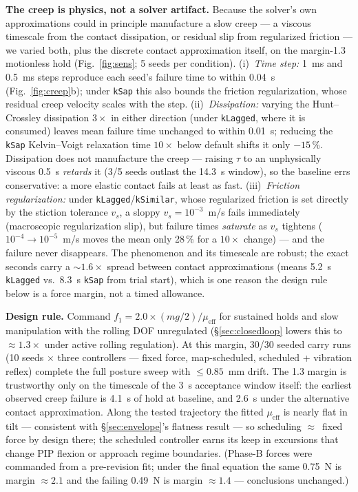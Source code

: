 \documentclass[journal]{IEEEtran}
\newcommand{\mueff}{\mu_{\mathrm{eff}}}
\begin{document}
\textbf{The creep is physics, not a solver artifact.} Because the solver's
own approximations could in principle manufacture a slow creep --- a
viscous timescale from the contact dissipation, or residual slip from
regularized friction --- we varied both, plus the discrete contact
approximation itself, on the margin-1.3 motionless hold
(Fig.~\ref{fig:sens}; 5 seeds per condition). (i)~\emph{Time step:}
1~ms and 0.5~ms steps reproduce each seed's failure time to within 0.04~s
(Fig.~\ref{fig:creep}b); under \texttt{kSap} this also bounds the friction
regularization, whose residual creep velocity scales with the step.
(ii)~\emph{Dissipation:} varying the Hunt--Crossley dissipation
$3\times$ in either direction (under \texttt{kLagged}, where it is
consumed) leaves mean failure time unchanged to within 0.01~s; reducing
the \texttt{kSap} Kelvin--Voigt relaxation time $10\times$ below default
shifts it only $-15\,\%$. Dissipation does not manufacture the creep ---
raising $\tau$ to an unphysically viscous 0.5~s \emph{retards} it (3/5
seeds outlast the 14.3~s window), so the baseline errs conservative: a
more elastic contact fails at least as fast. (iii)~\emph{Friction
regularization:} under \texttt{kLagged}/\texttt{kSimilar}, whose
regularized friction is set directly by the stiction tolerance $v_s$, a
sloppy $v_s = 10^{-3}$~m/s fails immediately (macroscopic regularization
slip), but failure times \emph{saturate} as $v_s$ tightens ($10^{-4} \to
10^{-5}$~m/s moves the mean only 28\,\% for a $10\times$ change) --- and
the failure never disappears. The phenomenon and its timescale are
robust; the exact seconds carry a ${\sim}1.6\times$ spread between
contact approximations (means 5.2~s \texttt{kLagged} vs.\ 8.3~s
\texttt{kSap} from trial start), which is one reason the design rule
below is a force margin, not a timed allowance.

\textbf{Design rule.} Command
$f_1 = 2.0 \times (mg/2)/\mueff$
for sustained holds and slow manipulation with the rolling DOF
unregulated (\S\ref{sec:closedloop} lowers this to
${\approx}1.3\times$ under active rolling regulation). At this margin, 30/30 seeded
carry runs (10 seeds $\times$ three controllers --- fixed force,
map-scheduled, scheduled + vibration reflex) complete the full posture
sweep with ${\le}0.85$~mm drift. The 1.3 margin is trustworthy only on
the timescale of the 3~s acceptance window itself: the earliest observed
creep failure is 4.1~s of hold at baseline, and 2.6~s under the
alternative contact approximation. Along the
tested trajectory the fitted $\mueff$ is nearly flat in tilt --- consistent
with \S\ref{sec:envelope}'s flatness result --- so scheduling
${\approx}$~fixed force by design there; the scheduled controller earns its
keep in excursions that change PIP flexion or approach regime boundaries.
(Phase-B forces were commanded from a pre-revision fit; under the final
equation the same 0.75~N is margin ${\approx}2.1$ and the failing 0.49~N is
margin ${\approx}1.4$ --- conclusions unchanged.)
\end{document}
